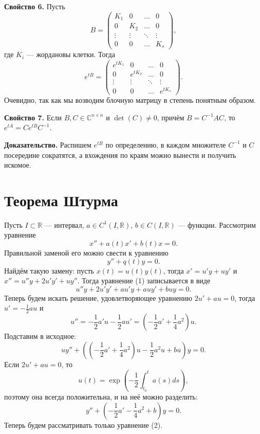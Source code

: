 \textbf{Свойство 6.} Пусть
\[
    B =
    \begin{pmatrix}
        K_1 & 0 & \dots & 0 \\
        0 & K_2 & \dots & 0 \\
        \vdots & \vdots & \ddots & \vdots \\
        0 & 0 & \dots & K_s
    \end{pmatrix} ,
\]
где $K_i$ --- жордановы клетки. Тогда
\[
    e^{tB} =
    \begin{pmatrix}
        e^{tK_1} & 0 & \dots & 0 \\
        0 & e^{tK_2} & \dots & 0 \\
        \vdots & \vdots & \ddots & \vdots \\
        0 & 0 & \dots & e^{tK_s}
    \end{pmatrix}.
\]
Очевидно, так как мы возводим блочную матрицу в степень понятным образом.

\textbf{Свойство 7.} Если $B, C \in \mathbb C^{n \times n}$ и $\det(C) \ne 0$, причём $B = C^{-1} A C$, то $e^{tA} = C e^{tB} C^{-1}$.

\textbf{Доказательство.} Распишем $e^{tB}$ по определению, в каждом множителе $C^{-1}$ и $C$ посередине сократятся, а вхождения по краям можно вынести и получить искомое.

\QED

\section{Теорема Штурма}
\setcounter{equation}{0}
Пусть $I \subset \mathbb R$ --- интервал, $a \in C^1(I, \mathbb R)$, $b \in C(I, \mathbb R)$ --- функции.
Рассмотрим уравнение
\begin{equation}
    x'' + a(t)x' + b(t)x = 0.
\end{equation}
Правильной заменой его можно свести к уравнению
\begin{equation}
    y'' + q(t)y = 0.
\end{equation}
Найдём такую замену: пусть $x(t) = u(t) y(t)$, тогда $x' = u'y + uy'$ и $x'' = u''y + 2u'y' + uy''$.
Тогда уравнение (1) записывается в виде
\[
    u''y + 2u'y' + au'y + auy' + buy = 0.
\]
Теперь будем искать решение, удовлетворяющее уравнению $2u' + au = 0$, тогда $u' = -\frac{1}{2} au$ и 
\[
    u'' = -\frac{1}{2} a'u - \frac{1}{2} au' = \left( -\frac{1}{2} a' + \frac{1}{4} a^2 \right) u.
\]
Подставим в исходное:
\[
    uy'' + \left( \left( -\frac{1}{2} a' + \frac{1}{4} a^2 \right) u - \frac{1}{2} a^2 u + bu \right) y = 0.
\]
Если $2u' + au = 0$, то
\[
    u(t) = \exp \left( -\frac{1}{2} \int_{t_0}^{t} a(s) ds \right),
\]
поэтому она всегда положительна, и на неё можно разделить:
\[
    y'' + \left(-\frac{1}{2} a' - \frac{1}{4} a^2 + b \right) y = 0.
\]
Теперь будем рассматривать только уравнение (2).

